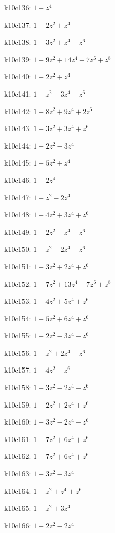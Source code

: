 k10c136: $ 1-z^{4} $ 

k10c137: $ 1-2z^{2}+z^{4} $ 

k10c138: $ 1-3z^{2}+z^{4}+z^{6} $ 

k10c139: $ 1+9z^{2}+14z^{4}+7z^{6}+z^{8} $ 

k10c140: $ 1+2z^{2}+z^{4} $ 

k10c141: $ 1-z^{2}-3z^{4}-z^{6} $ 

k10c142: $ 1+8z^{2}+9z^{4}+2z^{6} $ 

k10c143: $ 1+3z^{2}+3z^{4}+z^{6} $ 

k10c144: $ 1-2z^{2}-3z^{4} $ 

k10c145: $ 1+5z^{2}+z^{4} $ 

k10c146: $ 1+2z^{4} $ 

k10c147: $ 1-z^{2}-2z^{4} $ 

k10c148: $ 1+4z^{2}+3z^{4}+z^{6} $ 

k10c149: $ 1+2z^{2}-z^{4}-z^{6} $ 

k10c150: $ 1+z^{2}-2z^{4}-z^{6} $ 

k10c151: $ 1+3z^{2}+2z^{4}+z^{6} $ 

k10c152: $ 1+7z^{2}+13z^{4}+7z^{6}+z^{8} $ 

k10c153: $ 1+4z^{2}+5z^{4}+z^{6} $ 

k10c154: $ 1+5z^{2}+6z^{4}+z^{6} $ 

k10c155: $ 1-2z^{2}-3z^{4}-z^{6} $ 

k10c156: $ 1+z^{2}+2z^{4}+z^{6} $ 

k10c157: $ 1+4z^{2}-z^{6} $ 

k10c158: $ 1-3z^{2}-2z^{4}-z^{6} $ 

k10c159: $ 1+2z^{2}+2z^{4}+z^{6} $ 

k10c160: $ 1+3z^{2}-2z^{4}-z^{6} $ 

k10c161: $ 1+7z^{2}+6z^{4}+z^{6} $ 

k10c162: $ 1+7z^{2}+6z^{4}+z^{6} $ 

k10c163: $ 1-3z^{2}-3z^{4} $ 

k10c164: $ 1+z^{2}+z^{4}+z^{6} $ 

k10c165: $ 1+z^{2}+3z^{4} $ 

k10c166: $ 1+2z^{2}-2z^{4} $ 

